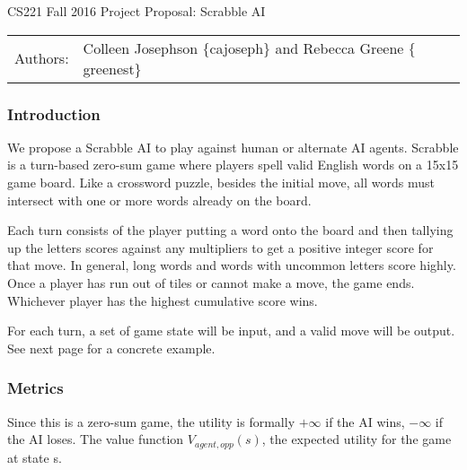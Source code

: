 \documentclass[12pt]{article}
\begin{document}
\begin{center}
{\Large CS221 Fall 2016 Project Proposal: Scrabble AI}

\begin{tabular}{rl}
  Authors: & Colleen Josephson $\{$cajoseph$\}$ and Rebecca Greene $\{$greenest$\}$\\
\end{tabular}
\end{center}

\subsubsection*{Introduction}
We propose a Scrabble AI to play against human or alternate AI
agents. Scrabble is a turn-based zero-sum game where players spell valid
English words on a 15x15 game board. Like a crossword puzzle, besides
the initial move, all words must intersect with one or more words
already on the board.

Each turn consists of the player putting a word onto the board and
then tallying up the letters scores against any multipliers to get a
positive integer score for that move. In general, long words and words
with uncommon letters score highly. Once a player has run out of tiles
or cannot make a move, the game ends. Whichever player has the highest
cumulative score wins.

 For each turn, a set of game state will be input, and a valid
move will be output. See next page for a concrete example. 





\subsubsection*{Metrics}
Since this is a zero-sum game, the utility is formally $+\infty$ if
the AI wins, $-\infty$ if the AI loses. The value function
$V_{agent,opp}(s)$, the expected utility for the game at state s.
\end{document}
